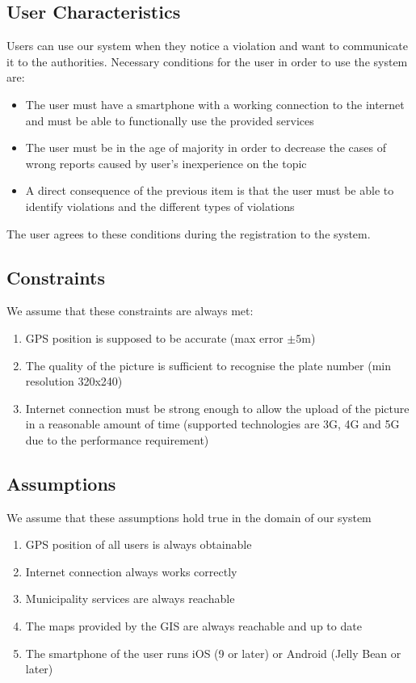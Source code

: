 \subsection{User Characteristics}
	Users can use our system when they notice a violation and want to communicate it to the authorities. Necessary conditions for the user in order to use the system are:
 	\begin{itemize}
 		\item The user must have a smartphone with a working connection to the internet and must be able to functionally use the provided services
 		\item The user must be in the age of majority in order to decrease the cases of wrong reports caused by user's inexperience on the topic 
 		\item A direct consequence of the previous item is that the user must be able to identify violations and the different types of violations
 	\end{itemize}
 	The user agrees to these conditions during the registration to the system.
 	
\subsection{Constraints}
\label{sec:constraints}
	We assume that these constraints are always met:
	\begin{enumerate}[label=\textbf{C\arabic*}]
		\item GPS position is supposed to be accurate (max error $\pm5$m)
		\item The quality of the picture is sufficient to recognise the plate number (min resolution 320x240)
		\item Internet connection must be strong enough to allow the upload of the picture in a reasonable amount of time (supported technologies are 3G, 4G and 5G due to the performance requirement)
	\end{enumerate}
	
\subsection{Assumptions}
	We assume that these assumptions hold true in the domain of our system 
	\begin{enumerate}[label=\textbf{	DA\arabic*}]
		\item GPS position of all users is always obtainable
		\item Internet connection always works correctly
		\item Municipality services are always reachable
		\item The maps provided by the GIS are always reachable and up to date
		\item The smartphone of the user runs iOS (9 or later) or Android (Jelly Bean or later)
	\end{enumerate}
		
\clearpage
